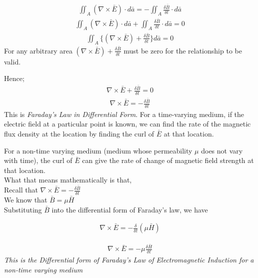 \begin{align*}
\iint_A(\nabla\times\bar{E})\cdot d\bar{a} = -\iint_A\frac{\delta \bar{B}}{\delta t}\cdot d\bar{a}
\end{align*}
\begin{align*}
\iint_A(\nabla\times\bar{E})\cdot d\bar{a} + \iint_A\frac{\delta \bar{B}}{\delta t}\cdot d\bar{a} = 0
\end{align*}
\begin{align*}
\iint_A\{(\nabla \times \bar{E})+ \frac{\delta \bar{B}}{\delta t}\} d\bar{a} = 0
\end{align*} 
For any arbitrary area $(\nabla \times \bar{E})+ \frac{\delta \bar{B}}{\delta t}$ must be zero for the relationship to be valid.

Hence;
\begin{align*}
\nabla \times \bar{E}+ \frac{\delta \bar{B}}{\delta t} = 0
\end{align*}
\begin{align}
\nabla \times \bar{E} = -\frac{\delta \bar{B}}{\delta t}
\end{align}
This is \emph{Faraday's Law in Differential Form}. For a time-varying medium, if the electric field at a particular point is known, we can find the rate of the magnetic flux density at the location by finding the curl of $\bar{E}$ at that location.

For a non-time varying medium (medium whose permeability $\mu$ does not vary with time), the curl of $\bar{E}$ can give the rate of change of magnetic field strength at that location.\\

What that means mathematically is that,\\


Recall that $\nabla \times \bar{E} = - \frac{\delta\bar{B}}{\delta t}$\\


We know that $\bar{B} = \mu \bar{H}$ $\quad$\\

Substituting $\bar{B}$ into the differential form of Faraday's law, we have	


\begin{align*}
\nabla \times \bar{E} = - \frac{\delta}{\delta t} (\mu\bar{H})
\end{align*}

\begin{align}
\nabla \times \bar{E} = -\mu\frac{\delta \bar{H}}{\delta t}
\end{align}
\emph{This is the Differential form of Faraday's Law of Electromagnetic Induction for a non-time varying medium}

